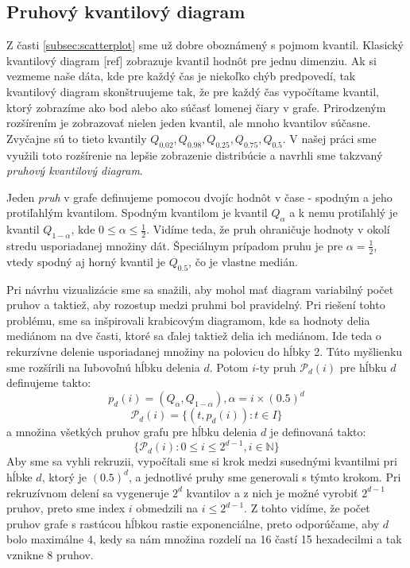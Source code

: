 \subsection{Pruhový kvantilový diagram} 
Z časti \ref{subsec:scatterplot} sme už dobre oboznámený s pojmom kvantil. Klasický kvantilový diagram [ref] zobrazuje kvantil hodnôt pre jednu dimenziu. Ak si vezmeme naše dáta, kde pre každý čas je niekoľko chýb predpovedí, tak kvantilový diagram skonštruujeme tak, že pre každý čas vypočítame kvantil, ktorý zobrazíme ako bod alebo ako súčasť lomenej čiary v grafe.
Prirodzeným rozšírením je zobrazovať nielen jeden kvantil, ale mnoho kvantilov súčasne. Zvyčajne sú to tieto kvantily $ Q_{0.02}, Q_{0.98}, Q_{0.25}, Q_{0.75}, Q_{0.5} $. V našej práci sme využili toto rozšírenie na lepšie zobrazenie distribúcie a navrhli sme takzvaný \textit{pruhový kvantilový diagram}.

Jeden \textit{pruh} v grafe definujeme pomocou dvojíc hodnôt v čase - spodným a jeho protiľahlým kvantilom. Spodným kvantilom je kvantil $ Q_{\alpha} $ a k nemu protiľahlý je kvantil $ Q_{1 - \alpha} $, kde $ 0 \leq \alpha \leq \frac{1}{2} $. Vidíme teda, že pruh ohraničuje hodnoty v okolí stredu usporiadanej množiny dát. Špeciálnym prípadom pruhu je pre $ \alpha = \frac{1}{2} $, vtedy spodný aj horný kvantil je $ Q_{0.5} $, čo je vlastne medián.

Pri návrhu vizualizácie sme sa snažili, aby mohol mať diagram variabilný počet pruhov a taktiež, aby rozostup medzi pruhmi bol pravidelný. Pri riešení tohto problému, sme sa inšpirovali krabicovým diagramom, kde sa hodnoty delia mediánom na dve časti, ktoré sa ďalej taktiež delia ich mediánom. Ide teda o rekurzívne delenie usporiadanej množiny na polovicu do hĺbky 2. Túto myšlienku sme rozšírili na ľubovoľnú hĺbku delenia $ d $. Potom $ i $-ty pruh $ \mathcal{P}_{d}(i) $ pre hĺbku $ d $ definujeme takto:
\[
	p_{d}(i) = (Q_{\alpha},Q_{1 - \alpha}) , \alpha = i \times (0.5)^d 	
\]
\[
	\mathcal{P}_{d}(i) = \{ (t,p_{d}(i)) : t \in I \}
\]
a množina všetkých pruhov grafu pre hĺbku delenia $ d $ je definovaná takto:
\[
	\{ \mathcal{P}_{d}(i) : 0 \leq i \leq 2^{d-1} , i \in \mathbb{N} \}
\]
Aby sme sa vyhli rekruzii, vypočítali sme si krok medzi susednými kvantilmi pri hĺbke $ d $, ktorý je $ (0.5)^d $, a jednotlivé pruhy sme generovali s týmto krokom. Pri rekruzívnom delení sa vygeneruje $ 2^d $ kvantilov a z nich je možné vyrobiť $ 2^{d - 1} $ pruhov, preto sme index $ i $ obmedzili na $ i \leq 2^{d-1} $. Z tohto vidíme, že počet pruhov grafe s rastúcou hĺbkou rastie exponenciálne, preto odporúčame, aby $ d $ bolo maximálne 4, kedy sa nám množina rozdelí na 16 častí 15 hexadecilmi a tak vznikne 8 pruhov.

